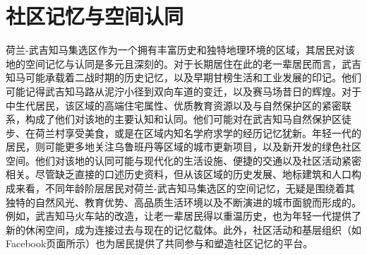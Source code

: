 \documentclass[11pt,a4paper,twoside,openany]{book}
\begin{document}
\section{社区记忆与空间认同}
荷兰-武吉知马集选区作为一个拥有丰富历史和独特地理环境的区域，其居民对该地的空间记忆与认同是多元且深刻的。对于长期居住在此的老一辈居民而言，武吉知马可能承载着二战时期的历史记忆，以及早期甘榜生活和工业发展的印记。他们可能记得武吉知马路从泥泞小径到双向车道的变迁，以及赛马场昔日的辉煌。对于中生代居民，该区域的高端住宅属性、优质教育资源以及与自然保护区的紧密联系，构成了他们对该地的主要认知和认同。他们可能对在武吉知马自然保护区徒步、在荷兰村享受美食，或是在区域内知名学府求学的经历记忆犹新。年轻一代的居民，则可能更多地关注乌鲁班丹等区域的城市更新项目，以及新开发的绿色社区空间。他们对该地的认同可能与现代化的生活设施、便捷的交通以及社区活动紧密相关。尽管缺乏直接的口述历史资料，但从该区域的历史发展、地标建筑和人口构成来看，不同年龄阶层居民对荷兰-武吉知马集选区的空间记忆，无疑是围绕着其独特的自然风光、教育优势、高品质生活环境以及不断演进的城市面貌而形成的。例如，武吉知马火车站的改造，让老一辈居民得以重温历史，也为年轻一代提供了新的休闲空间，成为连接过去与现在的记忆载体。此外，社区活动和基层组织（如Facebook页面所示）也为居民提供了共同参与和塑造社区记忆的平台。
\end{document}
